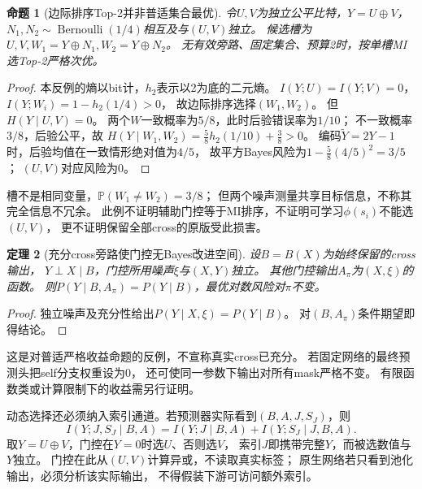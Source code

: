 \documentclass[UTF8,fontset=fandol,11pt,a4paper]{ctexart}
\newtheorem{theorem}{定理}[section]
\newtheorem{proposition}[theorem]{命题}
\theoremstyle{remark}
\newcommand{\Prob}{\mathbb P}
\begin{document}
\begin{proposition}[边际排序Top-2并非普适集合最优]\label{pr:xor}
令$U,V$为独立公平比特，$Y=U\oplus V$，
$N_1,N_2\sim\operatorname{Bernoulli}(1/4)$相互及与$(U,V)$独立。
候选槽为$U,V,W_1=Y\oplus N_1,W_2=Y\oplus N_2$。
无有效旁路、固定集合、预算2时，按单槽MI选Top-2严格次优。
\end{proposition}
\begin{proof}
本反例的熵以bit计，$h_2$表示以2为底的二元熵。
$I(Y;U)=I(Y;V)=0$，$I(Y;W_i)=1-h_2(1/4)>0$，
故边际排序选择$(W_1,W_2)$。
但$H(Y\mid U,V)=0$。
两个$W$一致概率为$5/8$，此时后验错误率为$1/10$；
不一致概率$3/8$，后验公平，故
$H(Y\mid W_1,W_2)=\frac58h_2(1/10)+\frac38>0$。
编码$\widetilde Y=2Y-1$时，后验均值在一致情形绝对值为$4/5$，
故平方Bayes风险为$1-\frac58(4/5)^2=3/5$；
$(U,V)$对应风险为0。
\end{proof}
槽不是相同变量，$\Prob(W_1\ne W_2)=3/8$；
但两个噪声测量共享目标信息，不称其完全信息不冗余。
此例不证明辅助门控等于MI排序，不证明可学习$\phi(s_i)$不能选$(U,V)$，
更不证明保留全部cross的原版受此损害。

\begin{theorem}[充分cross旁路使门控无Bayes改进空间]\label{th:bypass}
设$B=B(X)$为始终保留的cross输出，
$Y\perp X\mid B$，门控所用噪声$\xi$与$(X,Y)$独立。
其他门控输出$A_\pi$为$(X,\xi)$的函数。
则$P(Y\mid B,A_\pi)=P(Y\mid B)$，最优对数风险对$\pi$不变。
\end{theorem}
\begin{proof}
独立噪声及充分性给出$P(Y\mid X,\xi)=P(Y\mid B)$。
对$(B,A_\pi)$条件期望即得结论。
\end{proof}
这是对普适严格收益命题的反例，不宣称真实cross已充分。
若固定网络的最终预测头把self分支权重设为0，
还可使同一参数下输出对所有mask严格不变。
有限函数类或计算限制下的收益需另行证明。

动态选择还必须纳入索引通道。若预测器实际看到$(B,A,J,S_J)$，则
\[
 I(Y;J,S_J\mid B,A)
 =I(Y;J\mid B,A)+I(Y;S_J\mid J,B,A).
\]
取$Y=U\oplus V$，门控在$Y=0$时选$U$、否则选$V$，
索引$J$即携带完整$Y$，而被选数值与$Y$独立。
门控在此从$(U,V)$计算异或，不读取真实标签；
原生网络若只看到池化输出，必须分析该实际输出，
不得假装下游可访问额外索引。
\end{document}
